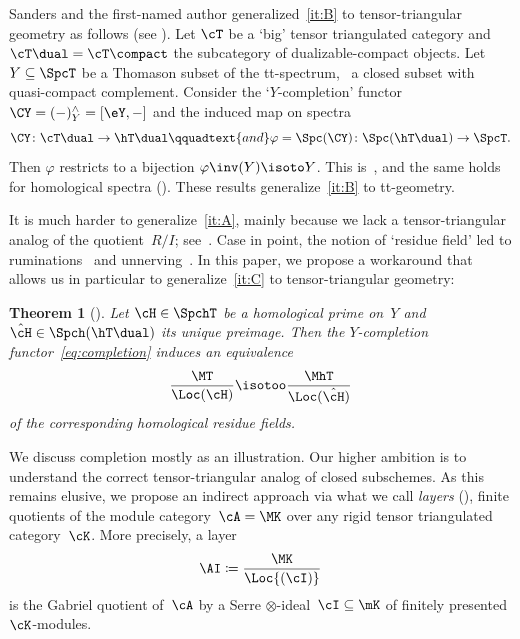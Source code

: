 \documentclass[11pt]{amsart}
\numberwithin{equation}{section} %
\theoremstyle{plain}
\newtheorem{thm}[equation]{Theorem}
\theoremstyle{definition}
\theoremstyle{remark}
\begin{document}
Sanders and the first-named author generalized~\eqref{it:B} to tensor-triangular geometry as follows (see ). Let $\cT$ be a `big' tensor triangulated category and~$\cT\dual=\cT\compact$ the subcategory of dualizable-compact objects. Let $Y\subseteq \SpcT$ be a Thomason subset of the tt-spectrum, \eg\ a closed subset with quasi-compact complement.
Consider the `$Y$\!-completion' functor~$\CY=(-)^{\wedge}_{Y}=[\eY,-]$ and the induced map on spectra
%
\begin{equation}
\label{eq:completion}%
\CY\colon \cT\dual\to \hT\dual
\qquadtext{and}
\varphi=\Spc(\CY)\colon \Spc(\hT\dual)\to \SpcT.
\end{equation}
%
Then $\varphi$ restricts to a bijection $\varphi\inv(Y)\isoto Y$. This is~\cite[Theorem~4.6]{BalmerSanders25}, and the same holds for homological spectra ().
These results generalize~\eqref{it:B} to tt-geometry.

It is much harder to generalize~\eqref{it:A}, mainly because we lack a tensor-triangular analog of the quotient~$R/I$; see~.
Case in point, the notion of `residue field' led to ruminations~\cite{BalmerKrauseStevenson19} and unnerving~\cite{Hyslopetal26pp,Coulembier26pp}. 
In this paper, we propose a workaround that allows us in particular to generalize~\eqref{it:C} to tensor-triangular geometry:
%
\begin{thm}[]
\label{thm:residue-completion-intro}%
Let $\cH\in \SpchT$ be a homological prime on~$Y$ and~$\hat\cH\in\Spch(\hT\dual)$ its unique preimage. Then the $Y$\!-completion functor~\eqref{eq:completion} induces an equivalence 
%
\begin{equation}
\label{eq:hres-equiv-intro}%
\frac{\MT}{\Loc(\cH)} \isotoo \frac{\MhT}{\Loc(\hat\cH)}
\end{equation}
%
of the corresponding homological residue fields.
\end{thm}

We discuss completion mostly as an illustration. Our higher ambition is to understand the correct tensor-triangular analog of closed subschemes.
As this remains elusive, we propose an indirect approach via what we call \emph{layers} (), \ie finite quotients
of the module category~$\cA=\MK$ over any rigid tensor triangulated category~$\cK$. More precisely, a layer 
%
\begin{equation}\label{eq:layer-intro}%
\AI\coloneq\frac{\MK}{\Loc{(\cI)}}
\end{equation}
%
is the Gabriel quotient of~$\cA$ by a Serre $\otimes$-ideal~$\cI\subseteq\mK$ of finitely presented $\cK$-modules.
\end{document}
